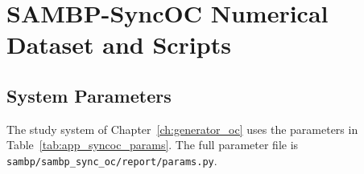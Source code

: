 \chapter{SAMBP-SyncOC Numerical Dataset and Scripts}
\label{app:syncoc}

\section{System Parameters}
\label{app:syncoc_params}

The study system of Chapter~\ref{ch:generator_oc} uses the parameters
in Table~\ref{tab:app_syncoc_params}. The full parameter file is
\texttt{sambp/sambp\_sync\_oc/report/params.py}.

